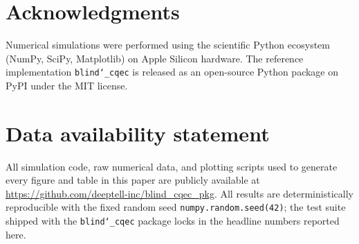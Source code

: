 \documentclass[12pt,a4paper]{article}
\begin{document}
\section*{Acknowledgments}
Numerical simulations were performed using the scientific Python ecosystem (NumPy, SciPy, Matplotlib) on Apple Silicon hardware.
The reference implementation \texttt{blind\char`\_cqec} is released as an open-source Python package on PyPI under the MIT license.

\section*{Data availability statement}
All simulation code, raw numerical data, and plotting scripts used to generate every figure and table in this paper are publicly available at \url{https://github.com/deeptell-inc/blind_cqec_pkg}. 
All results are deterministically reproducible with the fixed random seed \texttt{numpy.random.seed(42)}; the test suite shipped with the \texttt{blind\char`\_cqec} package locks in the headline numbers reported here.  
 
 
  
\end{document}
